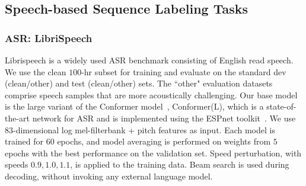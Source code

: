 \documentclass{article}
\newcommand{\SpA}{{\textsc{SpliceOut}}\xspace}
\begin{document}
\subsection{Speech-based Sequence Labeling Tasks}

\subsubsection{ASR: LibriSpeech}
\label{sec:libri}

Librispeech is a widely used ASR benchmark consisting of English read speech. We use the clean $100$-hr subset for training and evaluate on the standard dev (clean/other) and test (clean/other) sets. The ``other" evaluation datasets comprise speech samples that are more acoustically challenging. Our base model is the large variant of the Conformer model~\citep{conformer}, Conformer(L), which is a state-of-the-art network for ASR and is implemented using the ESPnet toolkit~\citep{espnet}. We use $83$-dimensional log mel-filterbank + pitch features as input. Each model is trained for $60$ epochs, and model averaging is performed on weights from $5$ epochs with the best performance on the validation set. Speed perturbation, with speeds $0.9, 1.0, 1.1$, is applied to the training data. Beam search is used during decoding, without invoking any external language model.

\end{document}

